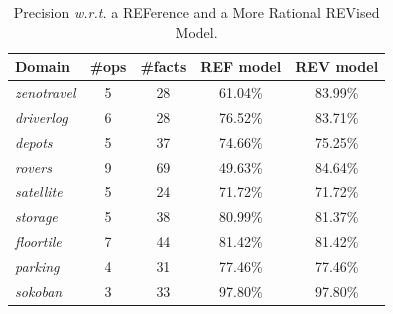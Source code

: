 \documentclass[10pt,journal,compsoc]{IEEEtran}
\begin{document}
\begin{table}
	\caption{Precision \textit{w.r.t.} a REFerence and a More Rational REVised Model.}
	\label{table:precisonevaluation}
	\begin{center}
		\small
		\begin{tabular}{p{1.3cm}cccc}
			Domain & \#ops & \#facts & REF model & REV model  \\
			
			\hline
			
			\emph{zenotravel} & 5 & 28 & 61.04\% & 83.99\% \\
			\emph{driverlog} & 6 & 28 & 76.52\% & 83.71\% \\
			\emph{depots} & 5 & 37 & 74.66\% & 75.25\% \\
			\emph{rovers} & 9 & 69 & 49.63\% & 84.64\% \\
			\emph{satellite} & 5 & 24 & 71.72\% & 71.72\% \\
			\emph{storage} & 5 & 38 & 80.99\% & 81.37\% \\
			\emph{floortile} & 7 & 44 & 81.42\% & 81.42\% \\			
			\emph{parking} & 4 & 31 & 77.46\% & 77.46\% \\
			\emph{sokoban} & 3 & 33 & 97.80\% & 97.80\% \\
			
			\hline
		\end{tabular}
		\normalsize
	\end{center}
\end{table}
\end{document}
